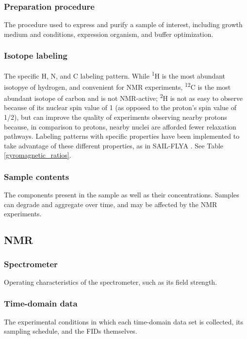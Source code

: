 \subsubsection{Preparation procedure}
The procedure used to express and purify a sample of interest, including
growth medium and conditions, expression organism, and buffer optimization.

\subsubsection{Isotope labeling}
The specific H, N, and C labeling pattern.  While \textsuperscript{1}H is 
the most abundant isotopye of hydrogen, and convenient for NMR experiments,
\textsuperscript{12}C is the most abundant isotope of carbon and is not 
NMR-active; \textsuperscript{2}H is not as easy to observe because of
its nuclear spin value of 1 (as opposed to the proton's spin value of 1/2),
but can improve the quality of experiments observing nearby protons because,
in comparison to protons, nearby nuclei are afforded fewer relaxation pathways.
Labeling patterns with specific properties have been implemented to take
advantage of these different properties, as in SAIL-FLYA \cite{sail_flya}.
See Table \ref{gyromagnetic_ratios}.

\subsubsection{Sample contents}
The components present in the sample as well as their concentrations.
Samples can degrade and aggregate over time, and may be affected by the
NMR experiments.

\subsection*{NMR}

\subsubsection{Spectrometer}
Operating characteristics of the spectrometer, such as its field strength.

\subsubsection{Time-domain data}
The experimental conditions in which each time-domain data set is collected, 
its sampling schedule, and the FIDs themselves.


